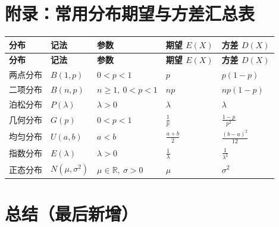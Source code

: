 \documentclass[12pt,a4paper]{ctexart}
\begin{document}
\newpage
\section*{附录：常用分布期望与方差汇总表}

\begin{center}
    \begin{longtable}{@{}lllll@{}}
        \toprule
        \textbf{分布} & \textbf{记法}        & \textbf{参数}                       & \textbf{期望 $E(X)$}  & \textbf{方差 $D(X)$}    \\
        \midrule
        \endfirsthead
        \toprule
        \textbf{分布} & \textbf{记法}        & \textbf{参数}                       & \textbf{期望 $E(X)$}  & \textbf{方差 $D(X)$}    \\
        \midrule
        \endhead
        \bottomrule
        \endfoot
        两点分布        & $B(1, p)$          & $0 < p < 1$                       & $p$                 & $p(1-p)$              \\
        二项分布        & $B(n, p)$          & $n \ge 1,\ 0 < p < 1$             & $np$                & $np(1-p)$             \\
        泊松分布        & $P(\lambda)$       & $\lambda > 0$                     & $\lambda$           & $\lambda$             \\
        几何分布        & $G(p)$             & $0 < p < 1$                       & $\frac{1}{p}$       & $\frac{1-p}{p^2}$     \\
        均匀分布        & $U(a, b)$          & $a < b$                           & $\frac{a+b}{2}$     & $\frac{(b-a)^2}{12}$  \\
        指数分布        & $E(\lambda)$       & $\lambda > 0$                     & $\frac{1}{\lambda}$ & $\frac{1}{\lambda^2}$ \\
        正态分布        & $N(\mu, \sigma^2)$ & $\mu \in \mathbb{R},\ \sigma > 0$ & $\mu$               & $\sigma^2$            \\
    \end{longtable}
\end{center}

\newpage
\section*{总结（最后新增）}

\end{document}

